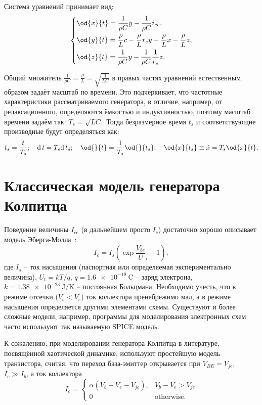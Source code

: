 Система уравнений принимает вид:
%
\begin{equation}
\label{atu:eq:colp_phys2}
\begin{dcases}
  \od{x}{t}  = \dfrac{1}{\rho C}  y - \dfrac{1}{\rho C} i_{ce} , \\
  \od{y}{t}  = \dfrac{\rho}{L} c    - \dfrac{\rho}{L} r_c y - \dfrac{\rho}{L} x- \dfrac{\rho}{L} z, \\
  \od{z}{t}  = \dfrac{1}{\rho C}  y - \dfrac{1}{\rho C} \dfrac{1}{r_e} z.
\end{dcases}
\end{equation}

Общий множитель $ \frac{1}{\rho C} = \frac{\rho}{L} = \sqrt{\frac{1}{LC}} $ в правых частях уравнений
естественным образом задаёт масштаб по времени.
Это подчёркивает, что частотные характеристики рассматриваемого генератора,
в отличие, например, от релаксационного,
определяются ёмкостью и индуктивностью,
поэтому масштаб времени задаём так:
$ T_s = \sqrt{L C} $.
Тогда безразмерное время $t_s$
и соответствующие производные
будут определяться как:
%
\[
  t_s = \frac{t}{T_s}; \quad
  \mathrm{d}\, t = T_s \mathrm{d}\, t_s; \quad
  \od{}{t}  = \frac{1}{T_s} \od{}{t_s}; \quad
  \od{x}{t_s} \equiv \dot{x} = T_s \od{x}{t} .
\]


\section{Классическая модель генератора Колпитца}  %

Поведение величины $I_{ce}$ (в дальнейшем просто $I_c$) достаточно хорошо описывает модель
Эберса-Молла~\cite{horowitz}:
%
\begin{equation}
  I_c = I_s \left( \exp\frac{V_{be}}U_t{} - 1 \right),
  \label{atu:eq:ebers-moll}
\end{equation}
%
где
$I_s$ -- ток насыщения (паспортная или определяемая экспериментально величина),
$U_t=kT/q$,
$q = \SI{1.6e-19}{\coulomb}$ -- заряд электрона,
$k = \SI{1.38e-23}{\joule/\kelvin}$ -- постоянная Больцмана.
Необходимо учесть, что в режиме отсечки ($V_b < V_e$) ток коллектора пренебрежимо мал,
а в режиме насыщения определяется другими элементами схемы.
Существуют и более сложные модели, например,
программы для моделирования электронных схем часто используют так называемую SPICE модель.

К сожалению, при моделировании генератора Колпитца в литературе,
посвящённой хаотической динамике, используют
простейшую модель транзистора, считая, что переход
база-эмиттер открывается при $V_{BE} = V_{je}$, $ I_c \gg I_b$,
а ток коллектора
%
\begin{equation}
I_c =
  \begin{cases}
    \alpha ( V_b - V_e - V_{je} ), & V_b - V_e > V_{je} \\
    0                              & \text{otherwise}.
  \end{cases}
  \label{atu:eq:bjt_libear_model}
\end{equation}


